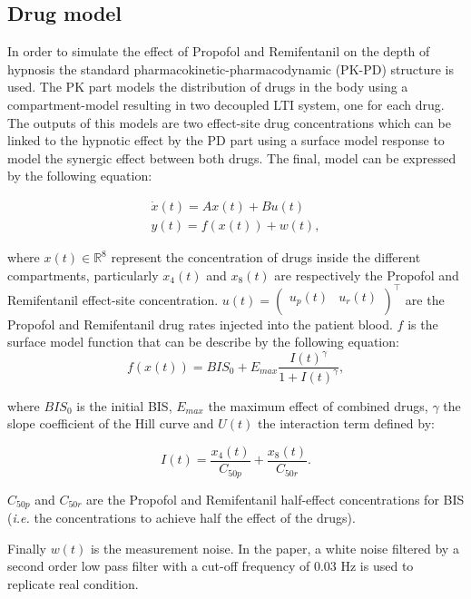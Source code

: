 \subsection{Drug model}
In order to simulate the effect of Propofol and Remifentanil on the depth of hypnosis the standard pharmacokinetic-pharmacodynamic (PK-PD) structure is used. The PK part models the distribution of drugs in the body using a compartment-model resulting in two decoupled LTI system, one for each drug. The outputs of this models are two effect-site drug concentrations which can be linked to the hypnotic effect by the PD part using a surface model response to model the synergic effect between both drugs. The final, model can be expressed by the following equation:

\begin{equation}
\begin{array}{ll}
        \dot{x}(t) = A x(t) + B u(t)\\
        y(t) = f(x(t)) + w(t),
    \end{array}
\label{eq:model}
\end{equation}

where $x(t) \in \mathbb{R} ^8$ represent the concentration of drugs inside the different compartments, particularly $x_4(t)$ and $x_8(t)$ are respectively the Propofol and Remifentanil effect-site concentration. $u(t)=\begin{pmatrix}
u_p(t) & u_r(t) \\
\end{pmatrix}^\top$ are the Propofol and Remifentanil drug rates injected into the patient blood. $f$ is the surface model function that can be describe by the following equation:
\begin{equation}
	f(x(t)) = BIS_0 + E_{max} \frac{I(t)^\gamma}{1 + I(t)^\gamma},
\end{equation}

where $BIS_0$ is the initial BIS, $E_{max}$ the maximum effect of combined drugs, $\gamma$ the slope coefficient of the Hill curve and $U(t)$ the interaction term defined by:

\begin{equation}
I(t) = \frac{x_{4}(t)}{C_{50p}} + \frac{x_{8}(t)}{C_{50r}}.
\end{equation}

$C_{50p}$ and $C_{50r}$ are the Propofol and Remifentanil half-effect concentrations for BIS ({\em i.e.} the concentrations to achieve half the effect of the drugs).

Finally $w(t)$ is the measurement noise. In the paper, a white noise filtered by a second order low pass filter with a cut-off frequency of 0.03 Hz is used to replicate real condition.
\medskip

